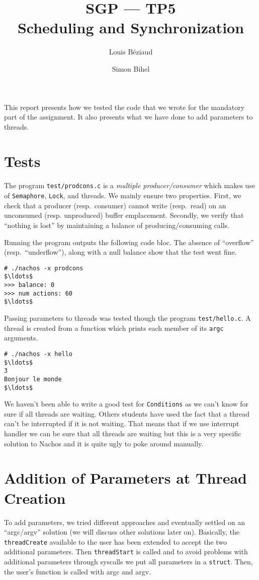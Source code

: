\documentclass[a4paper,11pt,english]{article}
\title{SGP --- TP5\\Scheduling and Synchronization}
\author{Louis Béziaud \and Simon Bihel}
\begin{document}
\maketitle

This report presents how we tested the code that we wrote for the mandatory part of the assignment. It also presents what we have done to add parameters to threads.

\section{Tests}
The program \texttt{test/prodcons.c} is a \textit{multiple producer/consumer} which makes use of \texttt{Semaphore}, \texttt{Lock}, and threads. We mainly ensure two properties. First, we check that a producer (resp.\ consumer) cannot write (resp.\ read) on an unconsumed (resp. unproduced) buffer emplacement. Secondly, we verify that ``nothing is lost'' by maintaining a balance of producing/consuming calls.

Running the program outputs the following code bloc. The absence of ``overflow'' (resp.\ ``underflow''), along with a null balance show that the test went fine.
\begin{lstlisting}[basicstyle=\ttfamily\small,mathescape]
# ./nachos -x prodcons
$\ldots$
>>> balance: 0
>>> num actions: 60
$\ldots$
\end{lstlisting}

Passing parameters to threads was tested though the program \texttt{test/hello.c}. A thread is created from a function which prints each member of its \texttt{argc} arguments.
\begin{lstlisting}[basicstyle=\ttfamily\small,mathescape]
# ./nachos -x hello
$\ldots$
3
Bonjour le monde 
$\ldots$
\end{lstlisting}

We haven't been able to write a good test for \texttt{Conditions} as we can't know for sure if all threads are waiting. Others students have used the fact that a thread can't be interrupted if it is not waiting. That means that if we use interrupt handler we can be sure that all threads are waiting but this is a very specific solution to Nachos and it is quite ugly to poke around manually.



\section{Addition of Parameters at Thread Creation}
To add parameters, we tried different approaches and eventually settled on an
``argc/argv'' solution (we will discuss other solutions later on). Basically,
the \texttt{threadCreate} available to the user has been extended to accept the
two additional parameters. Then \texttt{threadStart} is called and to avoid
problems with additional parameters through syscalls we put all parameters in a
\texttt{struct}. Then, the user's function is called with argc and argv.
\end{document}
